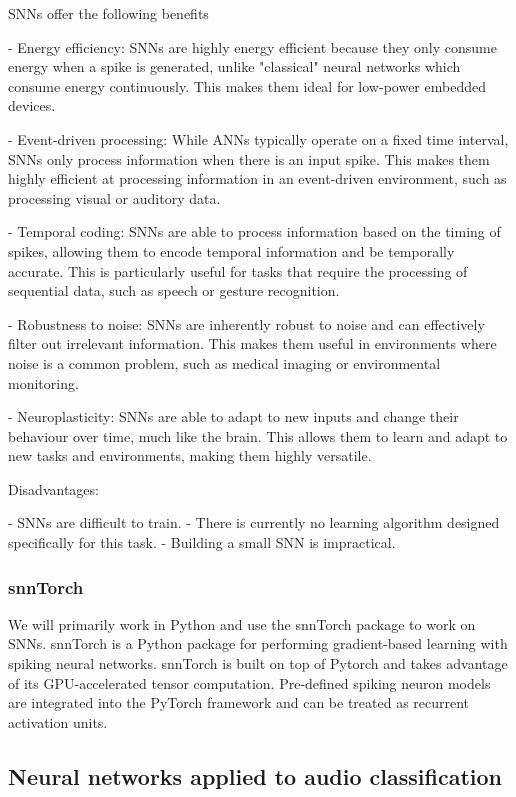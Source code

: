 \documentclass[11pt]{article}
\begin{document}
{\color{blue}
  SNNs offer the following benefits

  - Energy efficiency: SNNs are highly energy efficient because they only consume energy when a spike is generated, unlike "classical" neural networks which consume energy continuously. This makes them ideal for low-power embedded devices.

  - Event-driven processing: While ANNs typically operate on a fixed time interval, SNNs only process information when there is an input spike. This makes them highly efficient at processing information in an event-driven environment, such as processing visual or auditory data.

  - Temporal coding: SNNs are able to process information based on the timing of spikes, allowing them to encode temporal information and be temporally accurate. This is particularly useful for tasks that require the processing of sequential data, such as speech or gesture recognition.

  - Robustness to noise: SNNs are inherently robust to noise and can effectively filter out irrelevant information. This makes them useful in environments where noise is a common problem, such as medical imaging or environmental monitoring.

  - Neuroplasticity: SNNs are able to adapt to new inputs and change their behaviour over time, much like the brain. This allows them to learn and adapt to new tasks and environments, making them highly versatile.


  Disadvantages:

  - SNNs are difficult to train.
  - There is currently no learning algorithm designed specifically for this task.
  - Building a small SNN is impractical.
}



\subsubsection{snnTorch}
We will primarily work in Python and use the snnTorch package to work on SNNs. snnTorch is a Python package for performing gradient-based learning with spiking neural networks. snnTorch is built on top of Pytorch and takes advantage of its GPU-accelerated tensor computation. Pre-defined spiking neuron models are integrated into the PyTorch framework and can be treated as recurrent activation units.

\subsection{Neural networks applied to audio classification}
\end{document}
